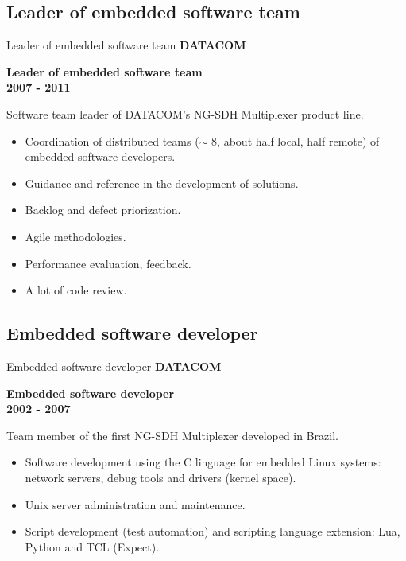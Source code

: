 \documentclass[ignorenonframetext]{beamer}
\providecommand{\tightlist}{\setlength{\itemsep}{0pt}\setlength{\parskip}{0pt}}
\newcommand{\myempha}[1]{{\color{dark27c1}\bf #1}}
\newcommand{\myemphb}[1]{{\color{dark27c2}\bf #1}}
\newcommand{\myemphc}[1]{{\color{dark27c3}\bf #1}}
\begin{document}
\subsection{Leader of embedded software team}
\begin{frame}[allowframebreaks]{Leader of embedded software team}
    \myempha{DATACOM}

    \myemphb{Leader of embedded software team} \\
    \hfill \myemphc{2007 - 2011}

    Software team leader of DATACOM's NG-SDH Multiplexer product line.
\begin{itemize}
\tightlist
\item
  Coordination of distributed teams (\(\sim\) 8, about half local, half
  remote) of embedded software developers.
\item
  Guidance and reference in the development of solutions.
\item
  Backlog and defect priorization.
\item
  Agile methodologies.
\item
  Performance evaluation, feedback.
\item
  A lot of code review.
\end{itemize}

\end{frame}



\subsection{Embedded software developer}
\begin{frame}[allowframebreaks]{Embedded software developer}
    \myempha{DATACOM}

    \myemphb{Embedded software developer} \\
    \hfill \myemphc{2002 - 2007}

    Team member of the first NG-SDH Multiplexer developed in Brazil.
\begin{itemize}
\tightlist
\item
  Software development using the C linguage for embedded Linux systems:
  network servers, debug tools and drivers (kernel space).
\item
  Unix server administration and maintenance.
\item
  Script development (test automation) and scripting language extension:
  Lua, Python and TCL (Expect).
\end{itemize}

\end{frame}
\end{document}
